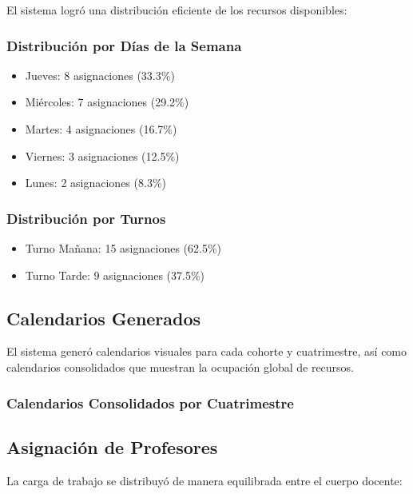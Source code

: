 El sistema logró una distribución eficiente de los recursos disponibles:

\subsubsection{Distribución por Días de la Semana}
\begin{itemize}
    \item Jueves: 8 asignaciones (33.3\%)
    \item Miércoles: 7 asignaciones (29.2\%)
    \item Martes: 4 asignaciones (16.7\%)
    \item Viernes: 3 asignaciones (12.5\%)
    \item Lunes: 2 asignaciones (8.3\%)
\end{itemize}

\subsubsection{Distribución por Turnos}
\begin{itemize}
    \item Turno Mañana: 15 asignaciones (62.5\%)
    \item Turno Tarde: 9 asignaciones (37.5\%)
\end{itemize}

\subsection{Calendarios Generados}

El sistema generó calendarios visuales para cada cohorte y cuatrimestre, así como calendarios consolidados que muestran la ocupación global de recursos.

\subsubsection{Calendarios Consolidados por Cuatrimestre}



\subsection{Asignación de Profesores}

La carga de trabajo se distribuyó de manera equilibrada entre el cuerpo docente:

